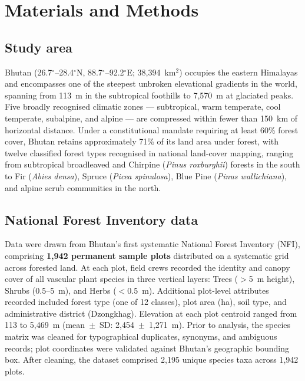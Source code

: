 \documentclass[review,12pt,a4paper]{elsarticle}
\begin{document}
\section{Materials and Methods}
\label{sec:methods}

\subsection{Study area}
\label{sec:study_area}

Bhutan (26.7$^\circ$--28.4$^\circ$N, 88.7$^\circ$--92.2$^\circ$E;
38{,}394~km$^2$) occupies the eastern Himalayas and encompasses one of the
steepest unbroken elevational gradients in the world, spanning from 113~m in
the subtropical foothills to 7{,}570~m at glaciated peaks. Five broadly
recognised climatic zones --- subtropical, warm temperate, cool temperate,
subalpine, and alpine --- are compressed within fewer than 150~km of
horizontal distance. Under a constitutional mandate requiring at least 60\%
forest cover, Bhutan retains approximately 71\% of its land area under forest,
with twelve classified forest types recognised in national land-cover mapping,
ranging from subtropical broadleaved and Chirpine (\textit{Pinus roxburghii})
forests in the south to Fir (\textit{Abies densa}), Spruce
(\textit{Picea spinulosa}), Blue Pine (\textit{Pinus wallichiana}), and alpine
scrub communities in the north.

\subsection{National Forest Inventory data}
\label{sec:nfi_data}

Data were drawn from Bhutan's first systematic National Forest Inventory
(NFI), comprising \textbf{1{,}942 permanent sample plots} distributed on a
systematic grid across forested land. At each plot, field crews recorded the
identity and canopy cover of all vascular plant species in three vertical
layers: Trees ($>$5~m height), Shrubs (0.5--5~m), and Herbs ($<$0.5~m).
Additional plot-level attributes recorded included forest type (one of 12
classes), plot area (ha), soil type, and administrative district (Dzongkhag).
Elevation at each plot centroid ranged from 113 to 5{,}469~m
(mean~$\pm$~SD: 2{,}454~$\pm$~1{,}271~m). Prior to analysis, the species
matrix was cleaned for typographical duplicates, synonyms, and ambiguous
records; plot coordinates were validated against Bhutan's geographic bounding
box. After cleaning, the dataset comprised 2{,}195 unique species taxa across
1{,}942 plots.
\end{document}
